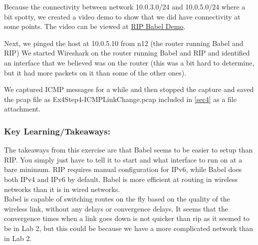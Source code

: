 \documentclass[main.tex]{subfiles}
\begin{document}
\noindent Because the connectivity between network 10.0.3.0/24 and 10.0.5.0/24 where a bit spotty, we created a video demo to show that we did have connectivity at some points.  The video can be viewed at \href{https://www.youtube.com/watch?v=C7KTfBb3bqo}{RIP Babel Demo}.


\noindent Next, we pinged the host at 10.0.5.10 from n12 (the router running Babel and RIP)
\noindent We started Wireshark on the router running Babel and RIP and identified an interface that we believed was on the router (this was a bit hard to determine, but it had more packets on it than some of the other ones).

\noindent We captured ICMP messages for a while and then stopped the capture and saved the pcap file as Ex4Step4-ICMPLinkChange.pcap included in \ref{sec4} as a file attachment.




\subsubsection{Key Learning/Takeaways:} 
\hfill \break
\noindent The takeaways from this exercise are that Babel seems to be easier to setup than RIP.  You simply just have to tell it to start and what interface to run on at a bare minimum.  RIP requires manual configuration for IPv6, while Babel does both IPv4 and IPv6 by default.  Babel is more efficient at routing in wireless networks than it is in wired networks.\\

\noindent Babel is capable of switching routes on the fly based on the quality of the wireless link, without any delays or convergence delays.  It seems that the convergence times when a link goes down is not quicker than rip as it seemed to be in Lab 2, but this could be because we have a more complicated network than in Lab 2.
\end{document}
